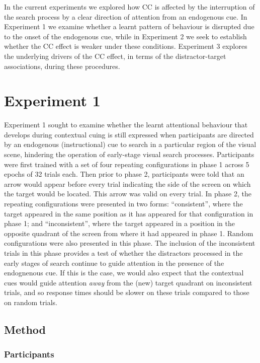 \documentclass[
  man,
  floatsintext,
  longtable,
  nolmodern,
  notxfonts,
  notimes,
  colorlinks=true,linkcolor=blue,citecolor=blue,urlcolor=blue]{apa7}
\begin{document}
In the current experiments we explored how CC is affected by the
interruption of the search process by a clear direction of attention
from an endogenous cue. In Experiment 1 we examine whether a learnt
pattern of behaviour is disrupted due to the onset of the endogenous
cue, while in Experiment 2 we seek to establish whether the CC effect is
weaker under these conditions. Experiment 3 explores the underlying
drivers of the CC effect, in terms of the distractor-target
associations, during these procedures.

\section{Experiment 1}\label{experiment-1}

Experiment 1 sought to examine whether the learnt attentional behaviour
that develops during contextual cuing is still expressed when
participants are directed by an endogenous (instructional) cue to search
in a particular region of the visual scene, hindering the operation of
early-stage visual search processes. Participants were first trained
with a set of four repeating configurations in phase 1 across 5 epochs
of 32 trials each. Then prior to phase 2, participants were told that an
arrow would appear before every trial indicating the side of the screen
on which the target would be located. This arrow was valid on every
trial. In phase 2, the repeating configurations were presented in two
forms: ``consistent'', where the target appeared in the same position as
it has appeared for that configuration in phase 1; and ``inconsistent'',
where the target appeared in a position in the opposite quadrant of the
screen from where it had appeared in phase 1. Random configurations were
also presented in this phase. The inclusion of the inconsistent trials
in this phase provides a test of whether the distractors processed in
the early stages of search continue to guide attention in the presence
of the endognenous cue. If this is the case, we would also expect that
the contextual cues would guide attention \emph{away} from the (new)
target quadrant on inconsistent trials, and so response times should be
slower on these trials compared to those on random trials.

\subsection{Method}\label{method}

\subsubsection{Participants}\label{participants}
\end{document}
